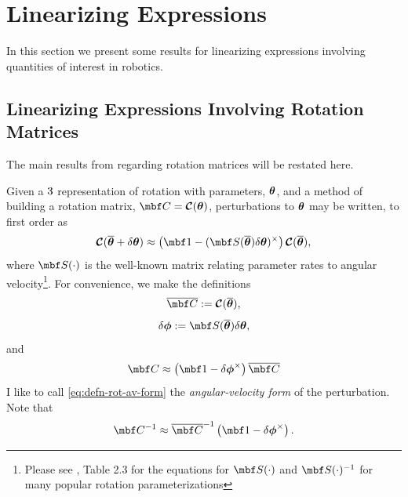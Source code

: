 \documentclass[11pt,a4,oneside]{article}
\begin{document}
\tableofcontents
\clearpage

\clearpage
\section{Linearizing Expressions}
In this section we present some results for linearizing expressions involving quantities of interest in robotics.
\subsection{Linearizing Expressions Involving Rotation Matrices \label{s:Rot}}
The main results from \citet{FurgaleThesis} regarding rotation matrices will be restated here.

Given a $3 \time 1$ representation of rotation with parameters, ${\boldsymbol{\theta}}$, and a method of building a rotation matrix, $\mbf C = \mbc C(\mbs \theta)$, perturbations to ${\boldsymbol{\theta}}$ may be written, to first order as
\begin{equation}
  \label{eq:perturb-rotation}
  \mbc C(\mbsbar \theta + \mbsdel \theta) \approx \left(\mbf 1 - (\mbf S(\mbsbar \theta) \mbsdel \theta )^\times \right) \mbc C( \mbsbar \theta ),
\end{equation}
where $\mbf S(\cdot)$ is the well-known matrix relating parameter rates to angular velocity\footnote{Please see \citet{Hughes8600}, Table 2.3 for the equations for $\mbf S(\cdot)$ and $\mbf S(\cdot)^{-1}$ for many popular rotation parameterizations}. For convenience, we make the definitions
\begin{equation}
  \label{eq:defn-cbar}
  \mbfbar C := \mbc C(\mbsbar \theta),
\end{equation}
\begin{equation}
  \label{eq:defn-dphi-eq-Sdt}
  \mbsdel \phi := \mbf S(\mbsbar \theta) \mbsdel \theta,
\end{equation}
and
\begin{equation}
  \label{eq:defn-rot-av-form}
  \mbf C \approx \left(\mbf 1 - \mbsdel \phi^\times \right)\mbfbar C
\end{equation}
I like to call \eqref{eq:defn-rot-av-form} the {\em angular-velocity form} of the perturbation. Note that
\begin{equation}
  \label{eq:defn-rot-av-form}
  \mbf C^{-1} \approx \mbfbar C^{-1}\left(\mbf 1 - \mbsdel \phi^\times \right).
\end{equation}
\end{document}
